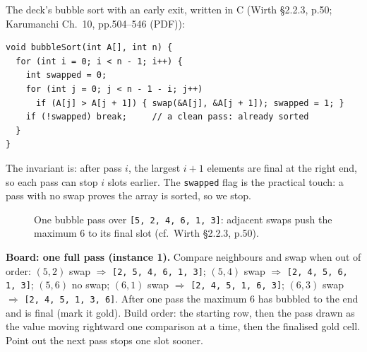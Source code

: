 \documentclass[11pt]{article}
\begin{document}
The deck's bubble sort with an early exit, written in C (Wirth \S2.2.3, p.50; Karumanchi Ch.~10, pp.504--546 (PDF)):

{\footnotesize
\begin{verbatim}
void bubbleSort(int A[], int n) {
  for (int i = 0; i < n - 1; i++) {
    int swapped = 0;
    for (int j = 0; j < n - 1 - i; j++)
      if (A[j] > A[j + 1]) { swap(&A[j], &A[j + 1]); swapped = 1; }
    if (!swapped) break;     // a clean pass: already sorted
  }
}
\end{verbatim}
}

The invariant is: after pass $i$, the largest $i+1$ elements are final at the right end, so each pass can stop $i$ slots earlier. The \texttt{swapped} flag is the practical touch: a pass with no swap proves the array is sorted, so we stop.

\begin{figure}[h]
  \centering
  \caption{One bubble pass over \texttt{[5, 2, 4, 6, 1, 3]}: adjacent swaps push the maximum $6$ to its final slot (cf.\ Wirth \S2.2.3, p.50).}
  \label{fig:bubble}
\end{figure}

\textbf{Board: one full pass (instance 1).} Compare neighbours and swap when out of order: $(5,2)$ swap $\Rightarrow$ \texttt{[2, 5, 4, 6, 1, 3]}; $(5,4)$ swap $\Rightarrow$ \texttt{[2, 4, 5, 6, 1, 3]}; $(5,6)$ no swap; $(6,1)$ swap $\Rightarrow$ \texttt{[2, 4, 5, 1, 6, 3]}; $(6,3)$ swap $\Rightarrow$ \texttt{[2, 4, 5, 1, 3, 6]}. After one pass the maximum $6$ has bubbled to the end and is final (mark it gold). Build order: the starting row, then the pass drawn as the value moving rightward one comparison at a time, then the finalised gold cell. Point out the next pass stops one slot sooner.
\end{document}
